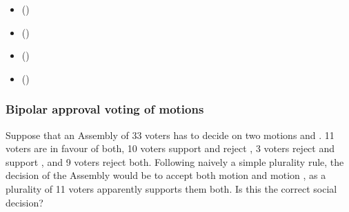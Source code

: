 \documentclass[a4paper,12pt,english]{sphinxhowto}
\begin{document}
\begin{sphinxcontents}
\begin{itemize}
\item {} 
\sphinxAtStartPar
{}\label{\detokenize{pearls:id153}}{\hyperref[\detokenize{pearls:bipolar-approval-voting-of-motions}]{}} ()

\item {} 
\sphinxAtStartPar
{}\label{\detokenize{pearls:id154}}{\hyperref[\detokenize{pearls:who-wins-the-election}]{}} ()

\item {} 
\sphinxAtStartPar
{}\label{\detokenize{pearls:id155}}{\hyperref[\detokenize{pearls:resolving-circular-social-preferences}]{}} ()

\item {} 
\sphinxAtStartPar
{}\label{\detokenize{pearls:id156}}{\hyperref[\detokenize{pearls:the-borda-rank-analysis-method}]{}} ()

\end{itemize}
\end{sphinxcontents}


\subsubsection{Bipolar approval voting of motions}
\label{\detokenize{pearls:bipolar-approval-voting-of-motions}}
\sphinxAtStartPar
Suppose that an Assembly of 33 voters has to decide on two motions  and . 11 voters are in favour of both, 10 voters support  and reject , 3 voters reject  and support , and 9 voters reject both. Following naively a simple plurality rule, the decision of the Assembly would be to accept both motion  and motion , as a plurality of 11 voters apparently supports them both. Is this the correct social decision?
\end{document}
